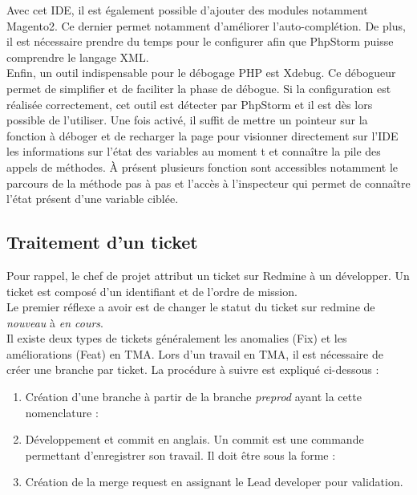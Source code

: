 \documentclass[12pt, a4paper, twoside]{report}
\begin{document}
Avec cet IDE, il est également possible d'ajouter des modules notamment Magento2. Ce dernier permet notamment d'améliorer l'auto-complétion. De plus, il est nécessaire prendre du temps pour le configurer afin que PhpStorm puisse comprendre le langage XML. \\

Enfin, un outil indispensable pour le débogage PHP est Xdebug. Ce débogueur permet de simplifier et de faciliter la phase de débogue. Si la configuration est réalisée correctement, cet outil est détecter par PhpStorm et il est dès lors possible de l'utiliser. Une fois activé, il suffit de mettre un pointeur sur la fonction à déboger et de recharger la page pour visionner directement sur l'IDE les informations sur l'état des variables au moment t et connaître la pile des appels de méthodes. À présent plusieurs fonction sont accessibles notamment le parcours de la méthode pas à pas et l'accès à l'inspecteur qui permet de connaître l'état présent d'une variable ciblée.  

\subsection{Traitement d'un ticket}

Pour rappel, le chef de projet attribut un ticket sur Redmine à un développer. Un ticket est composé d'un identifiant et de l'ordre de mission. \\

Le premier réflexe a avoir est de changer le statut du ticket sur redmine de \textit{nouveau} à \textit{en cours}. \\

Il existe deux types de tickets généralement les anomalies (Fix) et les améliorations (Feat) en TMA. Lors d'un travail en TMA, il est nécessaire de créer une branche par ticket. La procédure à suivre est expliqué ci-dessous :
\begin{enumerate}
	\item Création d'une branche à partir de la branche \textit{preprod} ayant la cette nomenclature :
	
		
	\item Développement et commit en anglais. Un commit est une commande permettant d'enregistrer son travail. Il doit être sous la forme : 
	
		
	\item Création de la merge request en assignant le Lead developer pour validation.\\
		
\end{enumerate}
\end{document}
